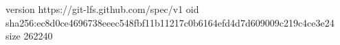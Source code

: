 version https://git-lfs.github.com/spec/v1
oid sha256:ec8d0ce4696738eeec548fbf11b11217c0b6164efd4d7d609009c219c4ce3e24
size 262240
